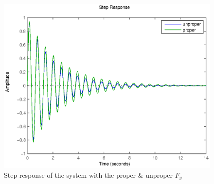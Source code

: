 \begin{figure}[h!b]
    \includegraphics[width=\columnwidth]{fig/stepProper421.eps}
    \caption{Step response of the system with the proper \& unproper $F_y$} 
    \label{bodeProper421}
\end{figure}

